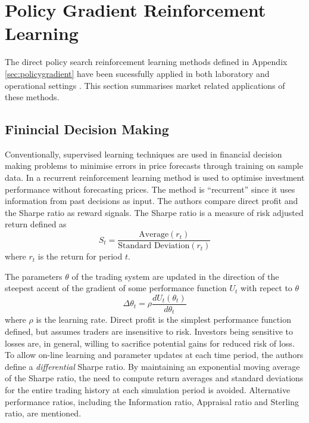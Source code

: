 \section{Policy Gradient Reinforcement Learning}
The direct policy search reinforcement learning methods defined in Appendix
\ref{sec:policygradient} have been sucessfully applied in both laboratory and
operational settings \cite{barto:policy,shaal:robots,peshkin:routing}.  This
section summarises market related applications of these methods.

\subsection{Finincial Decision Making}
Conventionally, supervised learning techniques are used in financial decision
making problems to minimise errors in price forecasts through training on
sample data.  In \cite{moody:98} a recurrent reinforcement learning
method is used to optimise investment performance without forecasting prices.
The method is ``recurrent'' since it uses information from past decisions as
input.  The authors compare direct profit and the Sharpe ratio
\cite{sharpe:ratio66,sharpe:ratio94} as reward signals. The Sharpe ratio is a
measure of risk adjusted return defined as
\begin{equation}
S_t = \frac{\mbox{Average}(r_t)}{\mbox{Standard Deviation}(r_t)}
\end{equation}
where $r_t$ is the return for period $t$.

The parameters $\theta$ of the trading system are updated in the direction of
the steepest accent of the gradient of some performance function $U_t$ with
repect to $\theta$
\begin{equation}
\Delta\theta_t = \rho \frac{dU_t(\theta_t)}{d\theta_t}
\end{equation}
where $\rho$ is the learning rate.  Direct profit is the simplest performance
function defined, but assumes traders are insensitive to risk.  Investors
being sensitive to losses are, in general, willing to sacrifice potential gains
for reduced risk of loss. To allow on-line learning and parameter updates at
each time period, the authors define a \textit{differential} Sharpe ratio.  By maintaining an
exponential moving average of the Sharpe ratio, the need to compute return
averages and standard deviations for the entire trading history at each
simulation period is avoided.  Alternative performance ratios, including the
Information ratio, Appraisal ratio and Sterling ratio, are mentioned.

